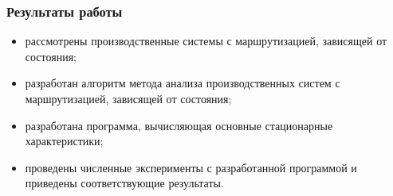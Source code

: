 
\begin{frame} \frametitle{Результаты работы}
\begin{itemize}
\item рассмотрены производственные системы с маршрутизацией, зависящей от состояния;
\item разработан алгоритм метода анализа производственных систем с маршрутизацией, зависящей от состояния;
\item разработана программа, вычисляющая основные стационарные характеристики;
\item проведены численные эксперименты с разработанной программой и приведены соответствующие результаты.
\end{itemize}
\end{frame}
